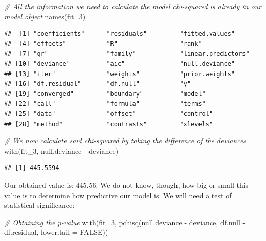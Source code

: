 \documentclass[
]{book}
\newenvironment{Shaded}{\begin{snugshade}}{\end{snugshade}}
\newcommand{\AttributeTok}[1]{\textcolor[rgb]{0.77,0.63,0.00}{#1}}
\newcommand{\CommentTok}[1]{\textcolor[rgb]{0.56,0.35,0.01}{\textit{#1}}}
\newcommand{\ConstantTok}[1]{\textcolor[rgb]{0.00,0.00,0.00}{#1}}
\newcommand{\FunctionTok}[1]{\textcolor[rgb]{0.00,0.00,0.00}{#1}}
\newcommand{\NormalTok}[1]{#1}
\newcommand{\SpecialCharTok}[1]{\textcolor[rgb]{0.00,0.00,0.00}{#1}}
\begin{document}
\begin{Shaded}
\begin{Highlighting}[]
\CommentTok{\# All the information we need to calculate the model chi{-}squared is already in our model object}
\FunctionTok{names}\NormalTok{(fit\_3)}
\end{Highlighting}
\end{Shaded}

\begin{verbatim}
##  [1] "coefficients"      "residuals"         "fitted.values"    
##  [4] "effects"           "R"                 "rank"             
##  [7] "qr"                "family"            "linear.predictors"
## [10] "deviance"          "aic"               "null.deviance"    
## [13] "iter"              "weights"           "prior.weights"    
## [16] "df.residual"       "df.null"           "y"                
## [19] "converged"         "boundary"          "model"            
## [22] "call"              "formula"           "terms"            
## [25] "data"              "offset"            "control"          
## [28] "method"            "contrasts"         "xlevels"
\end{verbatim}

\begin{Shaded}
\begin{Highlighting}[]
\CommentTok{\# We now calculate said chi{-}squared by taking the difference of the deviances }
\FunctionTok{with}\NormalTok{(fit\_3, null.deviance }\SpecialCharTok{{-}}\NormalTok{ deviance)}
\end{Highlighting}
\end{Shaded}

\begin{verbatim}
## [1] 445.5594
\end{verbatim}

Our obtained value is: 445.56. We do not know, though, how big or small this value is to determine how predictive our model is. We will need a test of statistical significance:

\begin{Shaded}
\begin{Highlighting}[]
\CommentTok{\# Obtaining the p{-}value}
\FunctionTok{with}\NormalTok{(fit\_3, }\FunctionTok{pchisq}\NormalTok{(null.deviance }\SpecialCharTok{{-}}\NormalTok{ deviance, df.null }\SpecialCharTok{{-}}\NormalTok{ df.residual, }\AttributeTok{lower.tail =} \ConstantTok{FALSE}\NormalTok{))}
\end{Highlighting}
\end{Shaded}
\end{document}
